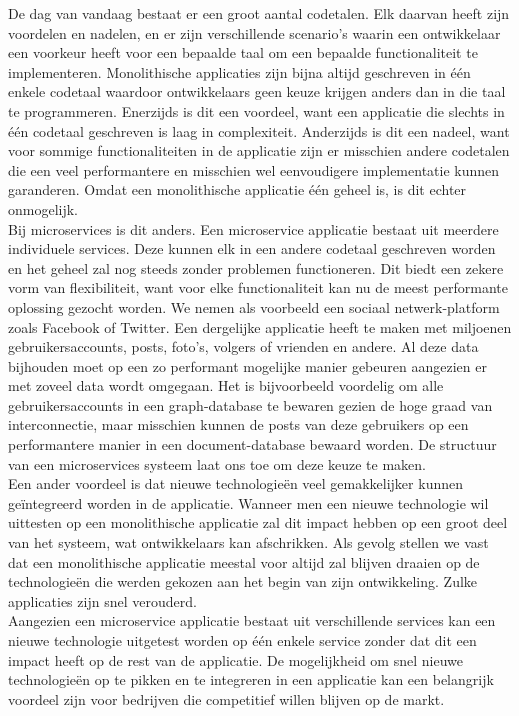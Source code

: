 De dag van vandaag bestaat er een groot aantal codetalen. Elk daarvan heeft zijn voordelen en nadelen, en er zijn verschillende scenario's waarin een ontwikkelaar een voorkeur heeft voor een bepaalde taal om een bepaalde functionaliteit te implementeren. Monolithische applicaties zijn bijna altijd geschreven in één enkele codetaal waardoor ontwikkelaars geen keuze krijgen anders dan in die taal te programmeren. Enerzijds is dit een voordeel, want een applicatie die slechts in één codetaal geschreven is laag in complexiteit. Anderzijds is dit een nadeel, want voor sommige functionaliteiten in de applicatie zijn er misschien andere codetalen die een veel performantere en misschien wel eenvoudigere implementatie kunnen garanderen. Omdat een monolithische applicatie één geheel is, is dit echter onmogelijk.
\\
Bij microservices is dit anders. Een microservice applicatie bestaat uit meerdere individuele services. Deze kunnen elk in een andere codetaal geschreven worden en het geheel zal nog steeds zonder problemen functioneren. Dit biedt een zekere vorm van flexibiliteit, want voor elke functionaliteit kan nu de meest performante oplossing gezocht worden. We nemen als voorbeeld een sociaal netwerk-platform zoals Facebook of Twitter. Een dergelijke applicatie heeft te maken met miljoenen gebruikersaccounts, posts, foto's, volgers of vrienden en andere. Al deze data bijhouden moet op een zo performant mogelijke manier gebeuren aangezien er met zoveel data wordt omgegaan. Het is bijvoorbeeld voordelig om alle gebruikersaccounts in een graph-database te bewaren gezien de hoge graad van interconnectie, maar misschien kunnen de posts van deze gebruikers op een performantere manier in een document-database bewaard worden. De structuur van een microservices systeem laat ons toe om deze keuze te maken.
\\
Een ander voordeel is dat nieuwe technologieën veel gemakkelijker kunnen geïntegreerd worden in de applicatie. Wanneer men een nieuwe technologie wil uittesten op een monolithische applicatie zal dit impact hebben op een groot deel van het systeem, wat ontwikkelaars kan afschrikken. Als gevolg stellen we vast dat een monolithische applicatie meestal voor altijd zal blijven draaien op de technologieën die werden gekozen aan het begin van zijn ontwikkeling. Zulke applicaties zijn snel verouderd.
\\
Aangezien een microservice applicatie bestaat uit verschillende services kan een nieuwe technologie uitgetest worden op één enkele service zonder dat dit een impact heeft op de rest van de applicatie. De mogelijkheid om snel nieuwe technologieën op te pikken en te integreren in een applicatie kan een belangrijk voordeel zijn voor bedrijven die competitief willen blijven op de markt.

